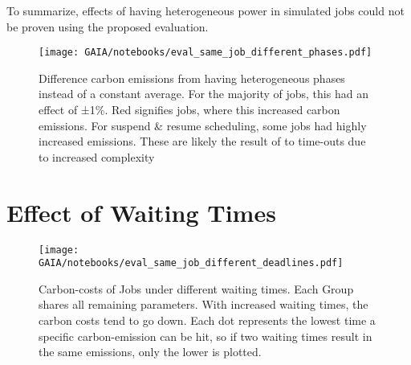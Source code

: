 To summarize, effects of having heterogeneous power in simulated jobs could not be proven using the proposed evaluation.

\begin{figure}
    \texttt{[image: GAIA/notebooks/eval\_same\_job\_different\_phases.pdf]}
    \caption[short]{Difference carbon emissions from having heterogeneous phases instead of a constant average. For the majority of jobs, this had an effect of ±1\%. Red signifies jobs, where this increased carbon emissions. For suspend \& resume scheduling, some jobs had highly increased emissions. These are likely the result of to time-outs due to increased complexity}

    \label{fig:different_phases_no_effect_lol}
\end{figure}

\section{Effect of Waiting Times}

\begin{figure}
    \texttt{[image: GAIA/notebooks/eval\_same\_job\_different\_deadlines.pdf]}
    \caption[short]{Carbon-costs of Jobs under different waiting times. Each Group shares all remaining parameters.
    With increased waiting times, the carbon costs tend to go down. Each dot represents the lowest time a specific carbon-emission can be hit, so if two waiting times result in the same emissions, only the lower is plotted.}

    \label{fig:eval_different_deadlines}
\end{figure}

